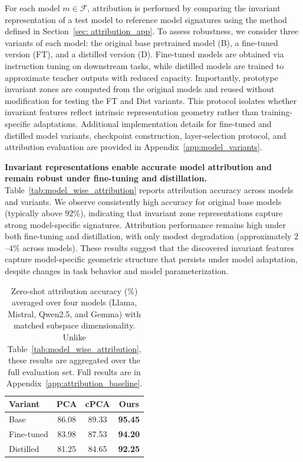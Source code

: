 For each model $m \in \mathcal{F}$, attribution is performed by comparing the invariant representation of a test model to reference model signatures using the method defined in Section~\ref{sec: attribution_app}. 
To assess robustness, we consider three variants of each model: the original base pretrained model (B), a fine-tuned version (FT), and a distilled version (D). Fine-tuned models are obtained via instruction tuning on downstream tasks, while distilled models are trained to approximate teacher outputs with reduced capacity. Importantly, prototype invariant zones are computed from the original models and reused without modification for testing the FT and Dist variants. This protocol isolates whether invariant features reflect intrinsic representation geometry rather than training-specific adaptations. Additional implementation details for fine-tuned and distilled model variants, checkpoint construction, layer-selection protocol, and attribution evaluation are provided in Appendix~\ref{app:model_variants}.

\textbf{Invariant representations enable accurate model attribution and remain robust under fine-tuning and distillation.}
Table~\ref{tab:model_wise_attribution} reports attribution accuracy across models and variants. We observe consistently high accuracy for original base models (typically above $92\%$), indicating that invariant zone representations capture strong model-specific signatures. Attribution performance remains high under both fine-tuning and distillation, with only modest degradation (approximately $2$--$4\%$ across models). These results suggest that the discovered invariant features capture model-specific geometric structure that persists under model adaptation, despite changes in task behavior and model parameterization. 


\begin{table}
\vspace{+0.5em}
\centering
\scriptsize
\setlength{\tabcolsep}{5pt}
\renewcommand{\arraystretch}{1.2}
\begin{tabular}{lccc}
\toprule
\textbf{Variant} & \textbf{PCA} & \textbf{cPCA} & \textbf{Ours} \\
\midrule
Base & 86.08 & 89.33 & \textbf{95.45} \\
Fine-tuned & 83.98 & 87.53 & \textbf{94.20} \\
Distilled & 81.25 & 84.65 & \textbf{92.25} \\
\bottomrule
\end{tabular}
\caption{Zero-shot attribution accuracy (\%) averaged over four models (Llama, Mistral, Qwen2.5, and Gemma) with matched subspace dimensionality. Unlike Table~\ref{tab:model_wise_attribution}, these results are aggregated over the full evaluation set. Full results are in Appendix~\ref{app:attribution_baseline}.}
\label{tab:attribution_baseline_main}
\vspace{-1.25em}
\end{table}


